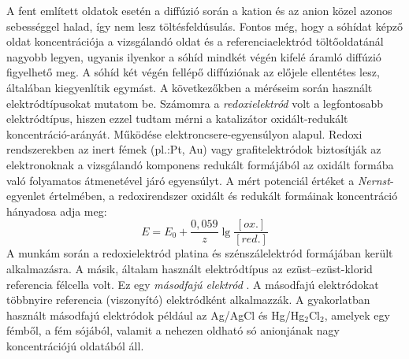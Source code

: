 A fent említett oldatok esetén a diffúzió során a kation és az anion közel azonos sebességgel halad, így nem lesz töltésfeldúsulás. Fontos még, hogy a sóhídat képző oldat koncentrációja a vizsgálandó oldat és a referenciaelektród töltőoldatánál nagyobb legyen, ugyanis ilyenkor a sóhíd mindkét végén kifelé áramló diffúzió figyelhető meg. A sóhíd két végén fellépő diffúziónak az előjele ellentétes lesz, általában kiegyenlítik egymást. A következőkben a méréseim során használt elektródtípusokat mutatom be. Számomra a \emph{redoxielektród} volt a legfontosabb elektródtípus, hiszen ezzel tudtam mérni a katalizátor oxidált-redukált koncentráció-arányát. Működése elektroncsere-egyensúlyon alapul. Redoxi rendszerekben az inert fémek (pl.:Pt, Au) vagy grafitelektródok biztosítják az elektronoknak a vizsgálandó komponens redukált formájából az oxidált formába való folyamatos átmenetével járó egyensúlyt. A mért potenciál értéket a \emph{Nernst}-egyenlet értelmében, a redoxirendszer oxidált és redukált formáinak koncentráció hányadosa adja meg:
\begin{equation}
E= E_\text{0} + \frac{0,059}{z} \lg \frac{[ox.]}{[red.]}
\end{equation}
A munkám során a redoxielektród platina és szénszálelektród formájában került alkalmazásra.
A másik, általam használt elektródtípus az ezüst--ezüst-klorid referencia félcella volt. Ez egy \emph{másodfajú elektród} \cite{pfreisich1960}. A másodfajú elektródokat többnyire referencia (viszonyító) elektródként alkalmazzák. A gyakorlatban használt másodfajú elektródok például az Ag/AgCl és Hg/Hg$_2$Cl$_2$, amelyek egy fémből, a fém sójából, valamit a nehezen oldható só anionjának nagy koncentrációjú oldatából áll.
    

